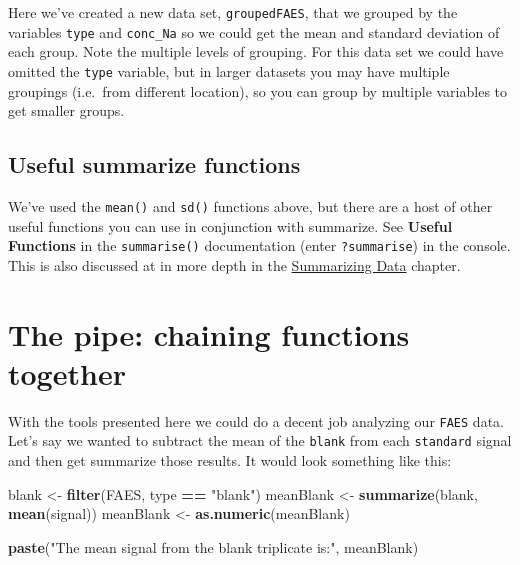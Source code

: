 \documentclass[
]{book}
\newenvironment{Shaded}{\begin{snugshade}}{\end{snugshade}}
\newcommand{\FunctionTok}[1]{\textcolor[rgb]{0.13,0.29,0.53}{\textbf{#1}}}
\newcommand{\NormalTok}[1]{#1}
\newcommand{\OtherTok}[1]{\textcolor[rgb]{0.56,0.35,0.01}{#1}}
\newcommand{\SpecialCharTok}[1]{\textcolor[rgb]{0.81,0.36,0.00}{\textbf{#1}}}
\newcommand{\StringTok}[1]{\textcolor[rgb]{0.31,0.60,0.02}{#1}}
\begin{document}
Here we've created a new data set, \texttt{groupedFAES}, that we grouped by the variables \texttt{type} and \texttt{conc\_Na} so we could get the mean and standard deviation of each group. Note the multiple levels of grouping. For this data set we could have omitted the \texttt{type} variable, but in larger datasets you may have multiple groupings (i.e.~from different location), so you can group by multiple variables to get smaller groups.

\hypertarget{useful-summarize-functions}{%
\subsection{Useful summarize functions}\label{useful-summarize-functions}}

We've used the \texttt{mean()} and \texttt{sd()} functions above, but there are a host of other useful functions you can use in conjunction with summarize. See \textbf{Useful Functions} in the \texttt{summarise()} documentation (enter \texttt{?summarise}) in the console. This is also discussed at in more depth in the \protect\hyperlink{summarizing-data}{Summarizing Data} chapter.

\hypertarget{the-pipe-chaining-functions-together}{%
\section{The pipe: chaining functions together}\label{the-pipe-chaining-functions-together}}

With the tools presented here we could do a decent job analyzing our \texttt{FAES} data. Let's say we wanted to subtract the mean of the \texttt{blank} from each \texttt{standard} signal and then get summarize those results. It would look something like this:

\begin{Shaded}
\begin{Highlighting}[]
\NormalTok{blank }\OtherTok{\textless{}{-}} \FunctionTok{filter}\NormalTok{(FAES, type }\SpecialCharTok{==} \StringTok{"blank"}\NormalTok{)}
\NormalTok{meanBlank }\OtherTok{\textless{}{-}} \FunctionTok{summarize}\NormalTok{(blank, }\FunctionTok{mean}\NormalTok{(signal))}
\NormalTok{meanBlank }\OtherTok{\textless{}{-}} \FunctionTok{as.numeric}\NormalTok{(meanBlank)}

\FunctionTok{paste}\NormalTok{(}\StringTok{"The mean signal from the blank triplicate is:"}\NormalTok{, meanBlank)}
\end{Highlighting}
\end{Shaded}
\end{document}
